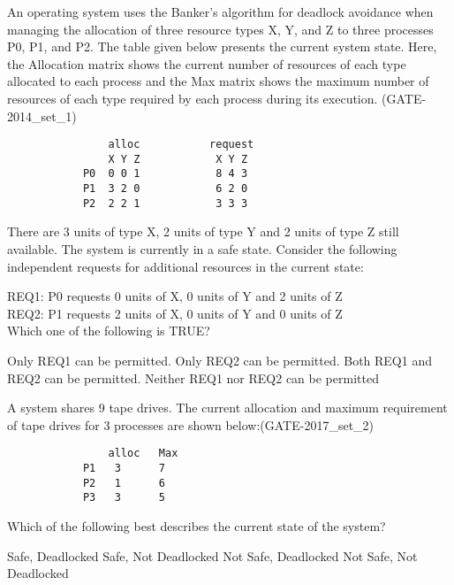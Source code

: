 \begin{minipage}{\linewidth}

  \question  An operating system uses the Banker’s algorithm for deadlock avoidance when managing the allocation of
             three resource types X, Y, and Z to three processes P0, P1, and P2. The table given below presents the
             current system state. Here, the Allocation matrix shows the current number of resources of each type
             allocated to each process and the Max matrix shows the maximum number of resources of each type required
             by each process during its execution. (GATE-2014\_set\_1)

             \begin{lstlisting}
                alloc           request
                X Y Z            X Y Z
            P0  0 0 1            8 4 3
            P1  3 2 0            6 2 0
            P2  2 2 1            3 3 3
            \end{lstlisting}


             There are 3 units of type X, 2 units of type Y and 2 units of type Z still available. The system is
             currently in a safe state. Consider the following independent requests for additional resources in the current state:

             REQ1: P0 requests 0 units of X, 0 units of Y and 2 units of Z \\
             REQ2: P1 requests 2 units of X, 0 units of Y and 0 units of Z \\
             Which one of the following is TRUE?
  \begin{choices}
    \choice  Only REQ1 can be permitted.
    \choice  Only REQ2 can be permitted.
    \choice  Both REQ1 and REQ2 can be permitted.
    \choice  Neither REQ1 nor REQ2 can be permitted
  \end{choices}

  \end{minipage}

\vspace{0.08in}


\begin{minipage}{\linewidth}

  \question   A system shares 9 tape drives. The current allocation and maximum requirement of tape drives for 3 processes are shown below:(GATE-2017\_set\_2)

  \begin{lstlisting}
                alloc   Max
            P1   3      7
            P2   1      6
            P3   3      5
            \end{lstlisting}

  Which of the following best describes the current state of the system?
  \begin{choices}
    \choice Safe, Deadlocked
    \choice Safe, Not Deadlocked
    \choice Not Safe, Deadlocked
    \choice Not Safe, Not Deadlocked
  \end{choices}

  \end{minipage}

